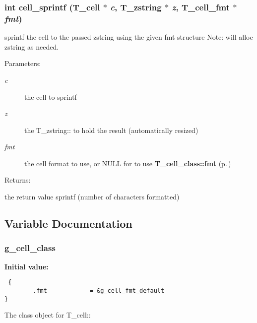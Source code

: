 \subsubsection{\setlength{\rightskip}{0pt plus 5cm}int cell\_\-sprintf ({\bf T\_\-cell} $\ast$ {\em c}, {\bf T\_\-zstring} $\ast$ {\em z}, {\bf T\_\-cell\_\-fmt} $\ast$ {\em fmt})}\label{group__table__cell_a6}


sprintf the cell to the passed zstring using the given fmt structure Note: will alloc zstring as needed. \begin{Desc}
\item[Parameters: ]\par
\begin{description}
\item[{\em 
c}]the cell to sprintf \item[{\em 
z}]the T\_\-zstring:: to hold the result (automatically resized) \item[{\em 
fmt}]the cell format to use, or NULL for to use {\bf T\_\-cell\_\-class::fmt} {\rm (p.\,\pageref{structS__cell__class_m0})} \end{description}
\end{Desc}
\begin{Desc}
\item[Returns: ]\par
the return value sprintf (number of characters formatted) \end{Desc}


\subsection{Variable Documentation}
\subsubsection{ g\_\-cell\_\-class}\label{group__table__cell_a1}


{\bf Initial value:}

\footnotesize\begin{verbatim} {
        .fmt            = &g_cell_fmt_default
}\end{verbatim}\normalsize 
The class object for T\_\-cell:: 
